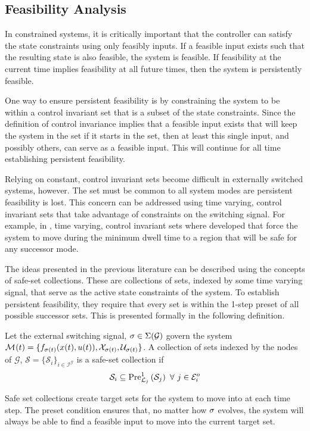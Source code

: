 \subsection{Feasibility Analysis}
In constrained systems, it is critically important that the controller can satisfy the state constraints using only feasibly inputs. If a feasible input exists such that the resulting state is also feasible, the system is feasible. If feasibility at the current time implies feasibility at all future times, then the system is persistently feasible.

One way to ensure persistent feasibility is by constraining the system to be within a control invariant set that is a subset of the state constraints. Since the definition of control invariance implies that a feasible input exists that will keep the system in the set if it starts in the set, then at least this single input, and possibly others, can serve as a feasible input. This will continue for all time establishing persistent feasibility. 

Relying on constant, control invariant sets become difficult in externally switched systems, however. The set must be common to all system modes are persistent feasibility is lost. This concern can be addressed using time varying, control invariant sets that take advantage of constraints on the switching signal. For example, in \cite{Danielson2019,Santis2004}, time varying, control invariant sets where developed that force the system to move during the minimum dwell time to a region that will be safe for any successor mode.

The ideas presented in the previous literature can be described using the concepts of safe-set collections. These are collections of sets, indexed by some time varying signal, that serve as the active state constraints of the system. To establish persistent feasibility, they require that every set is within the 1-step preset of all possible successor sets. This is presented formally in the following definition.
\begin{definition}
Let the external switching signal, $\ss\in\Sigma(\mathcal{G})$ govern the system $\mode{}(t)=\{f_{\ss(t)}(x(t),u(t)),\xcon[\ss(t)],\ucon[\ss(t)]\}$. A collection of sets indexed by the nodes of $\mathcal{G}$, $\mathcal{S}=\{\mathcal{S}_{i}\}_{i\in\mathcal{I}^\mathcal{G}}$ is a safe-set collection if
$$\mathcal{S}_{i}\subseteq\Pre[\mathcal{L}_j][1]{\mathcal{S}_{j}}\ \forall\ j\in \mathcal{E}^o_i$$
\end{definition}
Safe set collections create target sets for the system to move into at each time step. The preset condition ensures that, no matter how $\ss$ evolves, the system will always be able to find a feasible input to move into the current target set.
